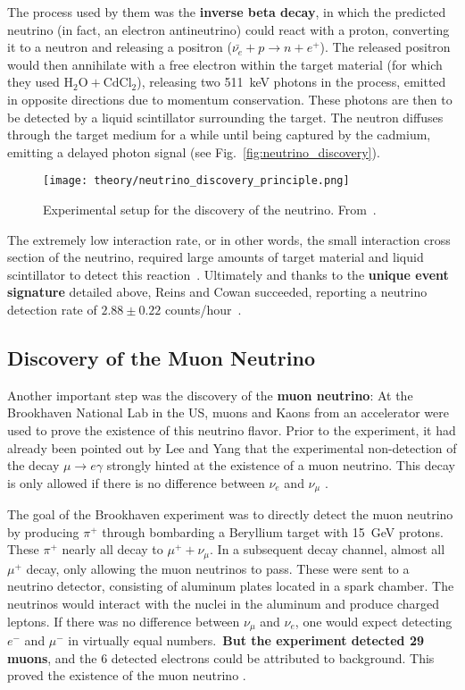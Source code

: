 The process used by them was the \textbf{inverse beta decay}, in which the predicted neutrino (in fact, an electron antineutrino) could react with a proton, converting it to a neutron and releasing a positron ($\bar{\nu_e} + p \rightarrow n + e^+$). The released positron would then annihilate with a free electron within the target material (for which they used $\text{H}_2\text{O} + \text{CdCl}_2$), releasing two \SI{511}{\kilo\eV} photons in the process, emitted in opposite directions due to momentum conservation. These photons are then to be detected by a liquid scintillator surrounding the target. The neutron diffuses through the target medium for a while until being captured by the cadmium, emitting a delayed photon signal (see Fig.~\ref{fig:neutrino_discovery}).

\begin{figure}[htb]
    \texttt{[image: theory/neutrino\_discovery\_principle.png]}
    \caption[Neutrino discovery schematic]{Experimental setup for the discovery of the neutrino. From~\cite{Reines1956}.}
\end{figure}

The extremely low interaction rate, or in other words, the small interaction cross section of the neutrino, required large amounts of target material and liquid scintillator to detect this reaction~\cite{Giunti2007}. Ultimately and thanks to the \textbf{unique event signature} detailed above, Reins and Cowan succeeded, reporting a neutrino detection rate of $2.88 \pm 0.22$ counts/hour~\cite{Reines1956}.

\subsection{Discovery of the Muon Neutrino}
Another important step was the discovery of the \textbf{muon neutrino}: At the Brookhaven National Lab in the US, muons and Kaons from an accelerator were used to prove the existence of this neutrino flavor. Prior to the experiment, it had already been pointed out by Lee and Yang that the experimental non-detection of the decay $\mu \rightarrow e \gamma$ strongly hinted at the existence of a muon neutrino. This decay is only allowed if there is no difference between $\nu_e$ and $\nu_\mu$ .

The goal of the Brookhaven experiment was to directly detect the muon neutrino by producing $\pi^+$ through bombarding a Beryllium target with \SI{15}{\giga\eV} protons. These $\pi^+$ nearly all decay to $\mu^+ + \nu_\mu$. In a subsequent decay channel, almost all $\mu^+$ decay, only allowing the muon neutrinos to pass. These were sent to a neutrino detector, consisting of aluminum plates located in a spark chamber. The neutrinos would interact with the nuclei in the aluminum and produce charged leptons. If there was no difference between $\nu_\mu$ and $\nu_e$, one would expect detecting $e^-$ and $\mu^-$ in virtually equal numbers.\ \textbf{But the experiment detected 29 muons}, and the 6 detected electrons could be attributed to background. This proved the existence of the muon neutrino .


